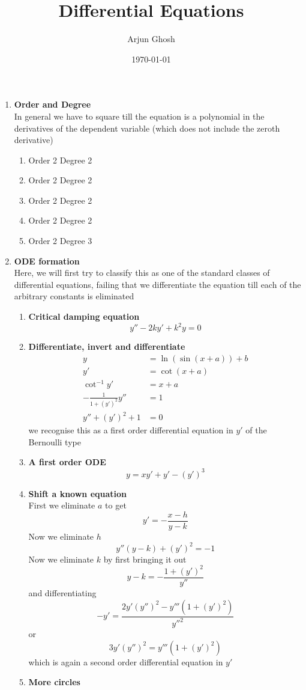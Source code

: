 \documentclass[12pt]{article}
\title{Differential Equations}
\author{Arjun Ghosh}
\date{\today}
\begin{document}
\maketitle
\begin{enumerate}

\item \textbf{Order and Degree} \\
In general we have to square till the equation is a polynomial in the derivatives of the dependent variable (which does not include the zeroth derivative) \\
\begin{enumerate}
	\item Order 2 Degree 2
	\item Order 2 Degree 2
	\item Order 2 Degree 2
	\item Order 2 Degree 2
	\item Order 2 Degree 3
\end{enumerate}


\item \textbf{ODE formation} \\
Here, we will first try to classify this as one of the standard classes of differential equations, failing that we differentiate the equation till each of the arbitrary constants is eliminated

\begin{enumerate}
\item \textbf{Critical damping equation} \\
$$
y'' -2ky' + k^{2} y = 0
$$
\item \textbf{Differentiate, invert and differentiate} \\
$$
\begin{aligned}
 y  & = \ln( \sin (x + a)) + b \\
 y'  & = \cot (x+a) \\
 \cot ^{-1} y'  & = x + a \\
-\frac{1}{1 + (y')^{2}} y''  & = 1 \ \\
y'' + (y')^{2} + 1  & = 0
\end{aligned}
$$
we recognise this as a first order differential equation in $y'$ of the Bernoulli type

\item \textbf{A first order ODE} \\
$$
y = xy' + y' - (y')^{3}
$$
\item \textbf{Shift a known equation} \\
First we eliminate $a$ to get
$$
y' = -\frac{x-h}{y-k}
$$
Now we eliminate $h$
$$
y''(y-k) + (y')^{2} = -1
$$
Now we eliminate $k$ by first bringing it out
$$
y - k = - \frac{1 + (y')^{2}}{y''}
$$
and differentiating
$$
-y' = \frac{2y'(y'')^{2} - y''' (1 + (y')^{2}) }{y''^{2}}
$$
or
$$
3y' (y'')^{2} = y''' ( 1 + (y')^{2})
$$
which is again a second order differential equation in $y'$ 

\item \textbf{More circles} \\


\end{enumerate}


\end{enumerate}
\end{document}
